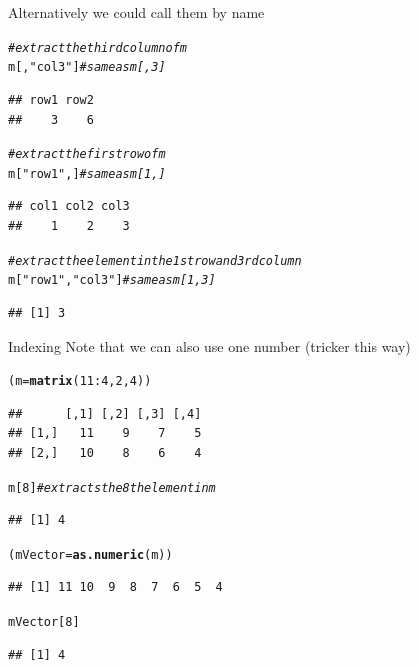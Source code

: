 \documentclass[xcolor=svgnames, 10pt]{beamer}
\makeatletter
\newcommand{\hlnum}[1]{\textcolor[rgb]{0.686,0.059,0.569}{#1}}%
\newcommand{\hlstr}[1]{\textcolor[rgb]{0.192,0.494,0.8}{#1}}%
\newcommand{\hlcom}[1]{\textcolor[rgb]{0.678,0.584,0.686}{\textit{#1}}}%
\newcommand{\hlopt}[1]{\textcolor[rgb]{0,0,0}{#1}}%
\newcommand{\hlstd}[1]{\textcolor[rgb]{0.345,0.345,0.345}{#1}}%
\newcommand{\hlkwb}[1]{\textcolor[rgb]{0.69,0.353,0.396}{#1}}%
\newcommand{\hlkwd}[1]{\textcolor[rgb]{0.737,0.353,0.396}{\textbf{#1}}}%
\newenvironment{kframe}{%
 \def\at@end@of@kframe{}%
 \ifinner\ifhmode%
  \def\at@end@of@kframe{\end{minipage}}%
  \begin{minipage}{\columnwidth}%
 \fi\fi%
 \def\FrameCommand##1{\hskip\@totalleftmargin \hskip-\fboxsep
 \colorbox{shadecolor}{##1}\hskip-\fboxsep
     \hskip-\linewidth \hskip-\@totalleftmargin \hskip\columnwidth}%
 \MakeFramed {\advance\hsize-\width
   \@totalleftmargin\z@ \linewidth\hsize
   \@setminipage}}%
 {\par\unskip\endMakeFramed%
 \at@end@of@kframe}
\newenvironment{knitrout}{}{} %
\makeatother
\begin{document}
\begin{frame}[fragile]{}
Alternatively we could call them by name
\begin{knitrout}\footnotesize
{}\color{fgcolor}\begin{kframe}
\begin{alltt}
\hlcom{# extract the third column of m}
\hlstd{m[,}\hlstr{"col3"}\hlstd{]} \hlcom{# same as m[,3]}
\end{alltt}
\begin{verbatim}
## row1 row2 
##    3    6
\end{verbatim}
\begin{alltt}
\hlcom{# extract the first row of m}
\hlstd{m[}\hlstr{"row1"}\hlstd{,]} \hlcom{# same as m[1,]}
\end{alltt}
\begin{verbatim}
## col1 col2 col3 
##    1    2    3
\end{verbatim}
\begin{alltt}
\hlcom{# extract the element in the 1st row and 3rd column}
\hlstd{m[}\hlstr{"row1"}\hlstd{,}\hlstr{"col3"}\hlstd{]} \hlcom{# same as m[1,3]}
\end{alltt}
\begin{verbatim}
## [1] 3
\end{verbatim}
\end{kframe}
\end{knitrout}
\end{frame}


\begin{frame}[fragile]{Indexing}
Note that we can also use one number (tricker this way)
\begin{knitrout}\footnotesize
{}\color{fgcolor}\begin{kframe}
\begin{alltt}
\hlstd{(m} \hlkwb{=} \hlkwd{matrix}\hlstd{(}\hlnum{11}\hlopt{:}\hlnum{4}\hlstd{,} \hlnum{2}\hlstd{,}\hlnum{4}\hlstd{))}
\end{alltt}
\begin{verbatim}
##      [,1] [,2] [,3] [,4]
## [1,]   11    9    7    5
## [2,]   10    8    6    4
\end{verbatim}
\begin{alltt}
\hlstd{m[}\hlnum{8}\hlstd{]} \hlcom{# extracts the 8th element in m}
\end{alltt}
\begin{verbatim}
## [1] 4
\end{verbatim}
\begin{alltt}
\hlstd{(mVector} \hlkwb{=} \hlkwd{as.numeric}\hlstd{(m))}
\end{alltt}
\begin{verbatim}
## [1] 11 10  9  8  7  6  5  4
\end{verbatim}
\begin{alltt}
\hlstd{mVector[}\hlnum{8}\hlstd{]}
\end{alltt}
\begin{verbatim}
## [1] 4
\end{verbatim}
\end{kframe}
\end{knitrout}
\end{frame}
\end{document}

